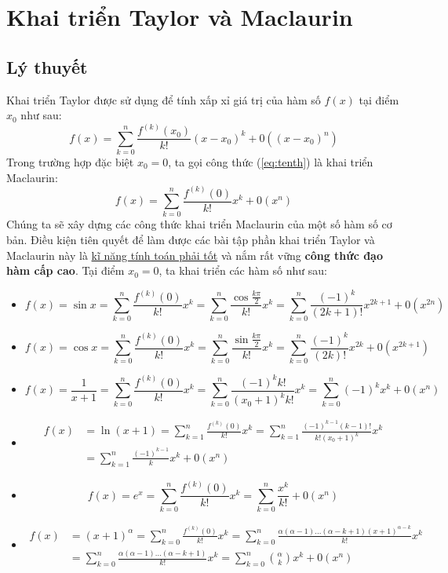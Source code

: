 \section{Khai triển Taylor và Maclaurin}
\subsection{Lý thuyết}
Khai triển Taylor được sử dụng để tính xấp xỉ giá trị của hàm số $f(x)$ tại điểm $x_{0}$ như sau:
\begin{equation}\label{eq:tenth}
f(x)=\sum_{k=0}^{n}\frac{f^{(k)}(x_{0})}{k!}(x-x_{0})^{k}+0((x-x_{0})^{n})
\end{equation}
Trong trường hợp đặc biệt $x_{0}=0$, ta gọi công thức (\ref{eq:tenth}) là khai triển Maclaurin:
\begin{equation}\label{eq:eleventh}
f(x)=\sum_{k=0}^{n}\frac{f^{(k)}(0)}{k!}x^k+0(x^n)
\end{equation}
Chúng ta sẽ xây dựng các công thức khai triển Maclaurin của một số hàm số cơ bản. Điều kiện tiên quyết để làm được các bài tập phần khai triển Taylor và Maclaurin này là \underline{kĩ năng tính toán phải tốt} và nắm rất vững \textbf{công thức đạo hàm cấp cao}.
Tại điểm $x_{0}=0$, ta khai triển các hàm số như sau:
\begin{itemize}
    \item $$f(x)=\sin{x}=\sum_{k=0}^{n}\frac{f^{(k)}(0)}{k!}x^k=\sum_{k=0}^{n}\frac{\cos{\frac{k\pi}{2}}}{k!}x^k=\sum_{k=0}^{n}\frac{(-1)^{k}}{(2k+1)!}x^{2k+1}+0(x^{2n})$$
    \item $$f(x)=\cos{x}=\sum_{k=0}^{n}\frac{f^{(k)}(0)}{k!}x^k=\sum_{k=0}^{n}\frac{\sin{\frac{k\pi}{2}}}{k!}x^k=\sum_{k=0}^{n}\frac{(-1)^{k}}{(2k)!}x^{2k}+0(x^{2k+1})$$
    \item $$f(x)=\frac{1}{x+1}=\sum_{k=0}^{n}\frac{f^{(k)}(0)}{k!}x^k=\sum_{k=0}^{n}\frac{(-1)^kk!}{(x_{0}+1)^kk!}x^k=\sum_{k=0}^{n}(-1)^kx^k+0(x^n)$$
    \item \begin{equation*}
        \begin{split}
        f(x)&=\ln{(x+1)}=\sum_{k=1}^{n}\frac{f^{(k)}(0)}{k!}x^k=\sum_{k=1}^{n}\frac{(-1)^{k-1}(k-1)!}{k!(x_{0}+1)^k}x^k\\&=\sum_{k=1}^{n}\frac{(-1)^{k-1}}{k}x^k+0(x^n)
        \end{split}
    \end{equation*}
    \item $$f(x)=e^x=\sum_{k=0}^{n}\frac{f^{(k)}(0)}{k!}x^k=\sum_{k=0}^{n}\frac{x^k}{k!}+0(x^n)$$
    \item \begin{equation*}
        \begin{split}
            f(x)&=(x+1)^\alpha=\sum_{k=0}^{n}\frac{f^{(k)}(0)}{k!}x^k=\sum_{k=0}^{n}\frac{\alpha(\alpha-1)...(\alpha-k+1)(x+1)^{\alpha-k}}{k!}x^{k}\\&=\sum_{k=0}^{n}\frac{\alpha(\alpha-1)...(\alpha-k+1)}{k!}x^k=\sum_{k=0}^{n}\binom{\alpha}{k}x^k+0(x^n)
        \end{split}
    \end{equation*}
\end{itemize}
